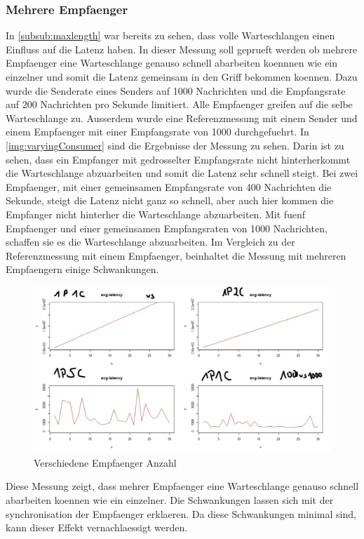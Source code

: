 \subsubsection{Mehrere Empfaenger}
In \autoref{subsub:maxlength} war bereits zu sehen, dass volle Warteschlangen einen Einfluss auf die Latenz haben. In dieser Messung soll geprueft werden ob mehrere Empfaenger eine Warteschlange genauso schnell abarbeiten koennnen wie ein einzelner und somit die Latenz gemeinsam in den Griff bekommen koennen. Dazu wurde die Senderate eines Senders auf 1000 Nachrichten und die Empfangsrate auf 200 Nachrichten pro Sekunde limitiert. Alle Empfaenger greifen auf die selbe Warteschlange zu. Ausserdem wurde eine Referenzmessung mit einem Sender und einem Empfaenger mit einer Empfangsrate von 1000 durchgefuehrt.
In \autoref{img:varyingConsumer} sind die Ergebnisse der Messung zu sehen. Darin ist zu sehen, dass ein Empfanger mit gedrosselter Empfangsrate nicht hinterherkommt die Warteschlange abzuarbeiten und somit die Latenz sehr schnell steigt. Bei zwei Empfaenger, mit einer gemeinsamen Empfangsrate von 400 Nachrichten die Sekunde, steigt die Latenz nicht ganz so schnell, aber auch hier kommen die Empfanger nicht hinterher die Warteschlange abzuarbeiten. Mit fuenf Empfaenger und einer gemeinsamen Empfangsraten von 1000 Nachrichten, schaffen sie es die Warteschlange abzuarbeiten. Im Vergleich zu der Referenzmessung mit einem Empfaenger, beinhaltet die Messung mit mehreren Empfaengern einige Schwankungen.
\begin{figure}
\center
  \includegraphics[width=1\textwidth]{images/varyingConsumer.jpg}
  \caption{Verschiedene Empfaenger Anzahl}
  \label{img:varyingConsumer}
\end{figure}
Diese Messung zeigt, dass mehrer Empfaenger eine Warteschlange genauso schnell abarbeiten koennen wie ein einzelner. Die Schwankungen lassen sich mit der synchronisation der Empfaenger erklaeren. Da diese Schwankungen minimal sind, kann dieser Effekt vernachlaessigt werden.

